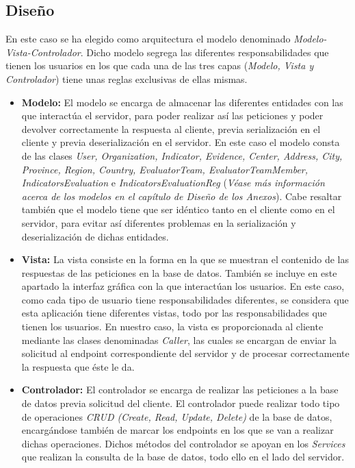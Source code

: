 \subsection{Diseño}
En este caso se ha elegido como arquitectura el modelo denominado
\textit{Modelo-Vista-Controlador}. Dicho modelo segrega las diferentes
responsabilidades que tienen los usuarios en los que cada una de las tres capas
(\textit{Modelo, Vista y Controlador}) tiene unas reglas exclusivas de ellas mismas.
\begin{itemize}
    \item \textbf{Modelo: }El modelo se encarga de almacenar las diferentes
    entidades con las que interactúa el servidor, para poder realizar así las
    peticiones y poder devolver correctamente la respuesta al cliente, previa
    serialización en el cliente y previa deserialización en el servidor. En este
    caso el modelo consta de las clases \textit{User, Organization, Indicator,
    Evidence, Center, Address, City, Province, Region, Country, EvaluatorTeam,
    EvaluatorTeamMember, IndicatorsEvaluation} e
    \textit{IndicatorsEvaluationReg} (\textit{Véase más información acerca de
    los modelos en el capítulo de Diseño de los Anexos}). Cabe resaltar también
    que el modelo tiene que ser idéntico tanto en el cliente como en el
    servidor, para evitar así diferentes problemas en la serialización y
    deserialización de dichas entidades. 
    \item \textbf{Vista: }La vista consiste en la forma en la que se muestran el
    contenido de las respuestas de las peticiones en la base de datos. También
    se incluye en este apartado la interfaz gráfica con la que interactúan los
    usuarios. En este caso, como cada tipo de usuario tiene responsabilidades
    diferentes, se considera que esta aplicación tiene diferentes vistas, todo
    por las responsabilidades que tienen los usuarios. En nuestro caso, la vista
    es proporcionada al cliente mediante las clases denominadas \textit{Caller},
    las cuales se encargan de enviar la solicitud al endpoint correspondiente
    del servidor y de procesar correctamente la respuesta que éste le da.
    \item \textbf{Controlador: }El controlador se encarga de realizar las
    peticiones a la base de datos previa solicitud del cliente. El controlador
    puede realizar todo tipo de operaciones \textit{CRUD (Create, Read, Update,
    Delete)} de la base de datos, encargándose también de marcar los endpoints
    en los que se van a realizar dichas operaciones. Dichos métodos del
    controlador se apoyan en los \textit{Services} que realizan la consulta de
    la base de datos, todo ello en el lado del servidor.
\end{itemize}

